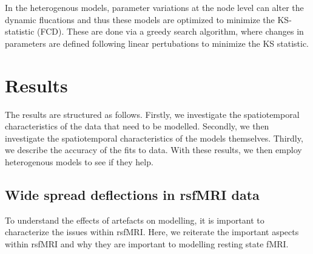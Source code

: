 \documentclass[oneside]{zHenriquesLab-StyleBioRxiv}
\begin{document}
In the heterogenous models, parameter variations at the node level can alter the dynamic flucations and thus these models are optimized to minimize the KS-statistic (FCD). These are done via a greedy search algorithm, where changes in parameters are defined following linear pertubations to minimize the KS statistic. 

\section*{Results}

The results are structured as follows. Firstly, we investigate the spatiotemporal characteristics of the data that need to be modelled. Secondly, we then investigate the spatiotemporal characteristics of the models themselves. Thirdly, we describe the accuracy of the fits to data. With these results, we then employ heterogenous models to see if they help.

\subsection*{Wide spread deflections in rsfMRI data}
To understand the effects of artefacts on modelling, it is important to characterize the issues within rsfMRI. Here, we reiterate the important aspects within rsfMRI and why they are important to modelling resting state fMRI. 
\end{document}
